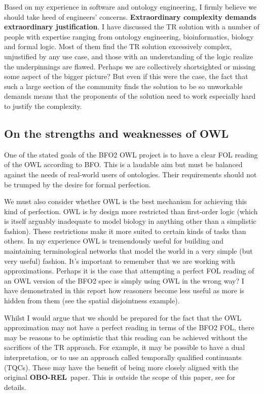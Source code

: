 \documentclass{bioinfo}
\def\OBOREL{\textbf{OBO-REL}}
\begin{document}
Based on my experience in software and ontology engineering, I firmly
believe we should take heed of engineers'
concerns. \textbf{Extraordinary complexity demands extraordinary
  justification}.  I have discussed the TR solution with a number of
people with expertise ranging from ontology engineering,
bioinformatics, biology and formal logic. Most of them find the TR
solution excessively complex, unjustified by any use case, and those
with an understanding of the logic realize the underpinnings are
flawed. Perhaps we are collectively shortsighted or missing some
aspect of the bigger picture? But even if this were the case, the fact
that such a large section of the community finds the solution to be so
unworkable demands means that the proponents of the solution need to
work especially hard to justify the complexity.

\subsection{On the strengths and weaknesses of OWL}

One of the stated goals of the BFO2 OWL project is to have a clear FOL
reading of the OWL according to BFO. This is a laudable aim but must
be balanced against the needs of real-world users of ontologies. Their
requirements should not be trumped by the desire for formal perfection.

We must also consider whether OWL is the best mechanism for achieving
this kind of perfection. OWL is by design more restricted than
first-order logic (which is itself arguably inadequate to model
biology in anything other than a simplistic fashion). These
restrictions make it more suited to certain kinds of tasks than
others. In my experience OWL is tremendously useful for building and
maintaining terminological networks that model the world in a very
simple (but very useful) fashion. It's important to remember that we
are working with approximations. Perhaps it is the case that
attempting a perfect FOL reading of an OWL version of the BFO2 spec is
simply using OWL in the wrong way? I have demonstrated in this report
how reasoners become less useful as more is hidden from them (see the
spatial disjointness example).

Whilst I would argue that we should be prepared for the fact that the
OWL approximation may not have a perfect reading in terms of the BFO2
FOL, there may be reasons to be optimistic that this reading can be
achieved without the sacrifices of the TR approach. For example, it
may be possible to have a dual interpretation, or to use an approach
called temporally qualified continuants (TQCs). These may have the
benefit of being more closely aligned with the original \OBOREL\
paper. This is outside the scope of this paper, see \cite{Grewe} for
details.
\end{document}
